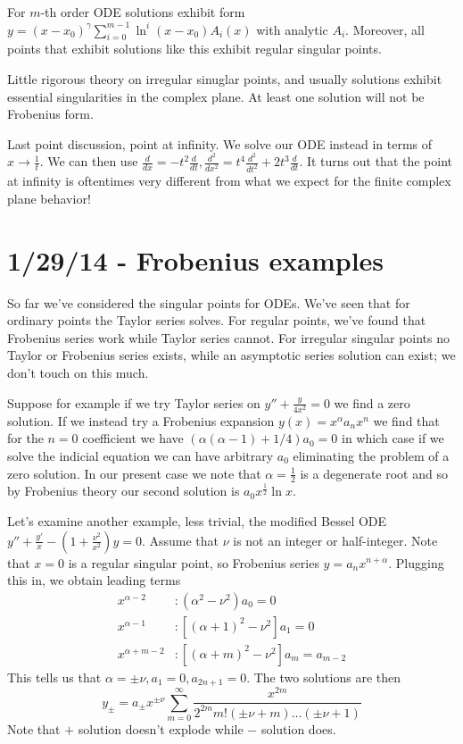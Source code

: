\documentclass[10pt]{report}
\newcommand{\rtd}[2]{\frac{d^2#1}{d#2^2}}
\newcommand{\rd}[2]{\frac{d#1}{d#2}}
\begin{document}
For $m$-th order ODE solutions exhibit form $y = (x-x_0)^\gamma\sum_{i=0}^{m-1}\ln^i(x-x_0)A_i(x)$ with analytic $A_i$. Moreover, all points that exhibit solutions like this exhibit regular singular points. 

Little rigorous theory on irregular sinuglar points, and usually solutions exhibit essential singularities in the complex plane. At least one solution will not be Frobenius form.

Last point discussion, point at infinity. We solve our ODE instead in terms of $x \to \frac{1}{t}$. We can then use $\rd{}{x} = -t^2\rd{}{t}, \rtd{}{x} = t^4\rtd{}{t} + 2t^3\rd{}{t}$. It turns out that the point at infinity is oftentimes very different from what we expect for the finite complex plane behavior!

\chapter{1/29/14 - Frobenius examples}

So far we've considered the singular points for ODEs. We've seen that for ordinary points the Taylor series solves. For regular points, we've found that Frobenius series work while Taylor series cannot. For irregular singular points no Taylor or Frobenius series exists, while an asymptotic series solution can exist; we don't touch on this much.

Suppose for example if we try Taylor series on $y'' + \frac{y}{4x^2} = 0$ we find a zero solution. If we instead try a Frobenius expansion $y(x) = x^\alpha a_n x^n$ we find that for the $n=0$ coefficient we have $(\alpha(\alpha - 1) + 1/4)a_0 = 0$ in which case if we solve the indicial equation we can have arbitrary $a_0$ eliminating the problem of a zero solution. In our present case we note that $\alpha = \frac{1}{2}$ is a degenerate root and so by Frobenius theory our second solution is $a_0 x^{\frac{1}{2}}\ln x$. 

Let's examine another example, less trivial, the modified Bessel ODE $y'' + \frac{y'}{x} - \left( 1 + \frac{\nu^2}{x^2} \right)y = 0$. Assume that $\nu$ is not an integer or half-integer. Note that $x=0$ is a regular singular point, so Frobenius series $y = a_n x^{n+\alpha}$. Plugging this in, we obtain leading terms
\begin{align}
    x^{\alpha - 2}&: (\alpha^2 - \nu^2)a_0 = 0\\
    x^{\alpha - 1}&: \left[ (\alpha + 1)^2 - \nu^2 \right]a_1 = 0\\
    x^{\alpha + m - 2}&: \left[ \left( \alpha + m \right)^2 - \nu^2 \right]a_{m} = a_{m-2}
\end{align}
This tells us that $\alpha = \pm \nu, a_1 = 0, a_{2n+1} = 0$. The two solutions are then
\begin{equation}
    y_{\pm} = a_{\pm}x^{\pm \nu}\sum_{m=0}^{\infty}\frac{x^{2m}}{2^{2m}m!\left( \pm \nu + m \right)\dots\left( \pm \nu + 1 \right)}
\end{equation}
Note that $+$ solution doesn't explode while $-$ solution does. 
\end{document}
